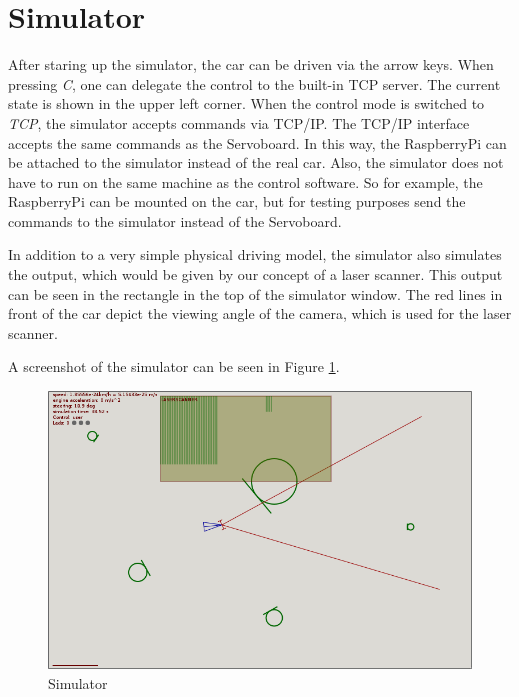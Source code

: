 \documentclass[a4paper
               ,10pt
               ,DIV=10 %
               ,BCOR=0.3cm
               ,pagesize %
               ,headings=small
               ,bibtotoc
               ]
               {scrartcl}
\begin{document}
\section{Simulator}


After staring up the simulator, the car can be driven via the arrow keys. When pressing \textit{C}, one can delegate the control to the built-in TCP server. The current state is shown in the upper left corner.
When the control mode is switched to \textit{TCP}, the simulator accepts commands via TCP/IP.
The TCP/IP interface accepts the same commands as the Servoboard.
In this way, the RaspberryPi can be attached to the simulator instead of the real car.
Also, the simulator does not have to run on the same machine as the control software.
So for example, the RaspberryPi can be mounted on the car, but for testing purposes send the commands to the simulator instead of the Servoboard.

In addition to a very simple physical driving model, the simulator also simulates the output, which would be given by our concept of a laser scanner. This output can be seen in the rectangle in the top of the simulator window. The red lines in front of the car depict the viewing angle of the camera, which is used for the laser scanner.

A screenshot of the simulator can be seen in Figure \ref{figsim}.

\begin{figure}[H]
\begin{center}
\includegraphics[width=15cm]{pic/sim.png}
\end{center}
\caption{Simulator}
\label{figsim}
\end{figure}
\end{document}
